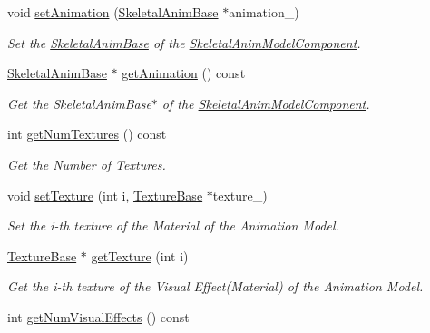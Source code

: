 \begin{DoxyCompactItemize}
void \hyperlink{class_magnum_1_1_skeletal_anim_model_component_aad8e817c95b1c90962696380592247e0}{set\+Animation} (\hyperlink{class_magnum_1_1_skeletal_anim_base}{Skeletal\+Anim\+Base} $\ast$animation\+\_\+)
\begin{DoxyCompactList}\small\item\em Set the \hyperlink{class_magnum_1_1_skeletal_anim_base}{Skeletal\+Anim\+Base} of the \hyperlink{class_magnum_1_1_skeletal_anim_model_component}{Skeletal\+Anim\+Model\+Component}. \end{DoxyCompactList}\item 
\hyperlink{class_magnum_1_1_skeletal_anim_base}{Skeletal\+Anim\+Base} $\ast$ \hyperlink{class_magnum_1_1_skeletal_anim_model_component_ac350d91ecf51b46a0b19173f29a176f1}{get\+Animation} () const 
\begin{DoxyCompactList}\small\item\em Get the Skeletal\+Anim\+Base$\ast$ of the \hyperlink{class_magnum_1_1_skeletal_anim_model_component}{Skeletal\+Anim\+Model\+Component}. \end{DoxyCompactList}\item 
int \hyperlink{class_magnum_1_1_skeletal_anim_model_component_ac54f5a11e93cfee47feea2e80e12e7ec}{get\+Num\+Textures} () const 
\begin{DoxyCompactList}\small\item\em Get the Number of Textures. \end{DoxyCompactList}\item 
void \hyperlink{class_magnum_1_1_skeletal_anim_model_component_a802570057dcaae040efd195f1d8a0aae}{set\+Texture} (int i, \hyperlink{class_magnum_1_1_texture_base}{Texture\+Base} $\ast$texture\+\_\+)
\begin{DoxyCompactList}\small\item\em Set the i-\/th texture of the Material of the Animation Model. \end{DoxyCompactList}\item 
\hyperlink{class_magnum_1_1_texture_base}{Texture\+Base} $\ast$ \hyperlink{class_magnum_1_1_skeletal_anim_model_component_ac1d60c34b538dd6a3809942c5def4a31}{get\+Texture} (int i)
\begin{DoxyCompactList}\small\item\em Get the i-\/th texture of the Visual Effect(\+Material) of the Animation Model. \end{DoxyCompactList}\item 
int \hyperlink{class_magnum_1_1_skeletal_anim_model_component_af26c4c7948f5210b97723611fd00cb3e}{get\+Num\+Visual\+Effects} () const 

\end{DoxyCompactItemize}
